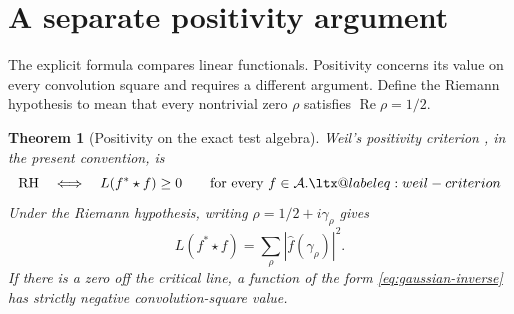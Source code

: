 \documentclass[11pt]{article}
\makeatletter
\newtheorem{theorem}{Theorem}[section]
\theoremstyle{definition}
\theoremstyle{remark}
\numberwithin{equation}{section}
\newcommand{\A}{\mathcal A}
\newcommand{\alsoeq}[1]{\ltx@label{#1}}
\makeatother
\begin{document}
\section{A separate positivity argument}
\label{sec:positivity}

The explicit formula compares linear functionals.
Positivity concerns its value on every convolution square and requires a
different argument.  Define the Riemann hypothesis to mean that every
nontrivial zero $\rho$ satisfies $\operatorname{Re}\rho=1/2$.

\begin{theorem}[Positivity on the exact test algebra]
\label{thm:positivity}
Weil's positivity criterion \cite{Weil1952}, in the present convention, is
\begin{equation}
 \mathrm{RH}\quad\Longleftrightarrow\quad L(f^*\star f)\geq0\qquad\text{for every }f\in\A.
 \label{eq:positivity}\alsoeq{eq:weil-criterion}
\end{equation}
Under the Riemann hypothesis, writing $\rho=1/2+i\gamma_\rho$ gives
\begin{equation}
 L(f^*\star f)=\sum_\rho|\widehat f(\gamma_\rho)|^2.
 \label{eq:zero-norm}
\end{equation}
If there is a zero off the critical line, a function of the form
\eqref{eq:gaussian-inverse} has strictly negative convolution-square value.
\end{theorem}
\end{document}
